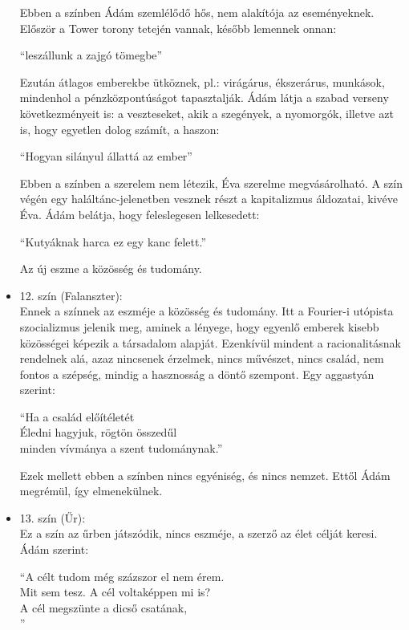 \documentclass[]{article}
\begin{document}
\begin{itemize}
			Ebben a színben Ádám szemlélődő hős, nem alakítója az eseményeknek. Először a Tower torony tetején vannak, később lemennek onnan:
			\begin{displayquote}
				\enquote{leszállunk a zajgó tömegbe}
			\end{displayquote}
			Ezután átlagos emberekbe ütköznek, pl.: virágárus, ékszerárus, munkások, mindenhol a pénzközpontúságot tapasztalják. Ádám látja a szabad verseny következményeit is: a veszteseket, akik a szegények, a nyomorgók, illetve azt is, hogy egyetlen dolog számít, a haszon:
			\begin{displayquote}
				\enquote{Hogyan silányul állattá az ember}
			\end{displayquote}
			Ebben a színben a szerelem nem létezik, Éva szerelme megvásárolható. A szín végén egy haláltánc-jelenetben vesznek részt a kapitalizmus áldozatai, kivéve Éva. Ádám belátja, hogy feleslegesen lelkesedett:
			\begin{displayquote}
				\enquote{Kutyáknak harca ez egy kanc felett.}
			\end{displayquote}
			Az új eszme a közösség és tudomány.
		\item 12. szín (Falanszter):\\
			Ennek a színnek az eszméje a közösség és tudomány. Itt a Fourier-i utópista szocializmus jelenik meg, aminek a lényege, hogy egyenlő emberek kisebb közösségei képezik a társadalom alapját. Ezenkívül mindent a racionalitásnak rendelnek alá, azaz nincsenek érzelmek, nincs művészet, nincs család, nem fontos a szépség, mindig a hasznosság a döntő szempont. Egy aggastyán szerint:
			\begin{displayquote}
				\enquote{Ha a család előítéletét\\
				Éledni hagyjuk, rögtön összedűl\\
				minden vívmánya a szent tudománynak.}
			\end{displayquote}
			Ezek mellett ebben a színben nincs egyéniség, és nincs nemzet. Ettől Ádám megrémül, így elmenekülnek.
		\item 13. szín (Űr):\\
			Ez a szín az űrben játszódik, nincs eszméje, a szerző az élet célját keresi. Ádám szerint:
			\begin{displayquote}
				\enquote{A célt tudom még százszor el nem érem.\\
				Mit sem tesz. A cél voltaképpen mi is?\\
				A cél megszünte a dicső csatának,\\
}
\end{displayquote}
\end{itemize}
\end{document}
